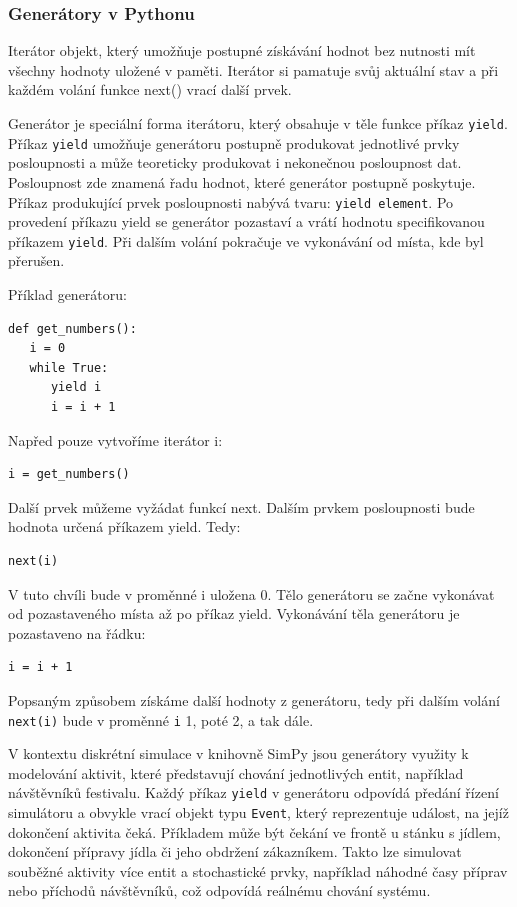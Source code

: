\documentclass[
  program=itp,
  biblatex,
  figures=false,
  glossaries,
  index
]{kidiplom}
\begin{document}
\subsubsection{Generátory v Pythonu}
Iterátor objekt, který umožňuje postupné získávání hodnot bez nutnosti mít všechny hodnoty uložené v paměti. Iterátor si pamatuje svůj aktuální stav a při každém volání funkce next() vrací další prvek.

Generátor je speciální forma iterátoru, který obsahuje v těle funkce příkaz \texttt{yield}. Příkaz \texttt{yield} umožňuje generátoru postupně produkovat jednotlivé prvky posloupnosti a může teoreticky produkovat i nekonečnou posloupnost dat. Posloupnost zde znamená řadu hodnot, které generátor postupně poskytuje. Příkaz produkující prvek posloupnosti nabývá tvaru: \texttt{yield element}. Po provedení příkazu yield se generátor pozastaví a vrátí hodnotu specifikovanou příkazem \texttt{yield}. Při dalším volání pokračuje ve vykonávání od místa, kde byl přerušen.

\noindent Příklad generátoru:
 \begin{verbatim} 
def get_numbers():
   i = 0
   while True:
      yield i
      i = i + 1
\end{verbatim}
Napřed pouze vytvoříme iterátor i: 
 \begin{verbatim} 
i = get_numbers()
\end{verbatim}
Další prvek můžeme vyžádat funkcí next. 
Dalším prvkem posloupnosti bude hodnota určená příkazem yield. Tedy:
 \begin{verbatim} 
next(i)
\end{verbatim}
V tuto chvíli bude v proměnné i uložena 0. Tělo generátoru se začne vykonávat od pozastaveného místa až po příkaz yield.  Vykonávání těla generátoru je pozastaveno na řádku:
 \begin{verbatim} 
i = i + 1
\end{verbatim}
Popsaným způsobem získáme další hodnoty z generátoru, tedy při dalším volání \texttt{next(i)} bude v proměnné \texttt{i} 1, poté 2, a tak dále.

V kontextu diskrétní simulace v knihovně SimPy jsou generátory využity k modelování aktivit, které představují chování jednotlivých entit, například návštěvníků festivalu. Každý příkaz \texttt{yield} v generátoru odpovídá předání řízení simulátoru a obvykle vrací objekt typu \texttt{Event}, který reprezentuje událost, na jejíž dokončení aktivita čeká. Příkladem může být čekání ve frontě u stánku s jídlem, dokončení přípravy jídla či jeho obdržení zákazníkem. Takto lze simulovat souběžné aktivity více entit a stochastické prvky, například náhodné časy příprav nebo příchodů návštěvníků, což odpovídá reálnému chování systému.
\end{document}
